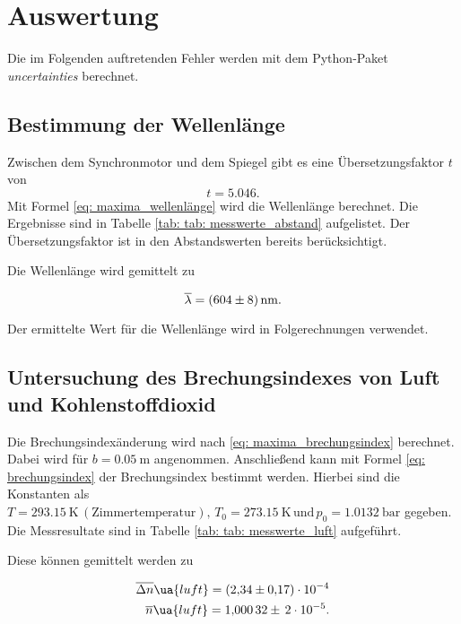 \newpage
\section{Auswertung}

Die im Folgenden auftretenden Fehler werden mit dem
Python-Paket \emph{uncertainties}\cite{uncertainties} berechnet.

\subsection{Bestimmung der Wellenlänge}
Zwischen dem Synchronmotor und dem Spiegel gibt es eine Übersetzungsfaktor $t$ von
\begin{equation*}
  t=5.046. %
\end{equation*}
Mit Formel \eqref{eq: maxima_wellenlänge} wird die Wellenlänge berechnet.
Die Ergebnisse sind in Tabelle \ref{tab: tab: messwerte_abstand} aufgelistet.
Der Übersetzungsfaktor ist in den Abstandswerten bereits berücksichtigt.



Die Wellenlänge wird gemittelt zu

\begin{equation}
  \label{eq:wellenlaenge}
  \overline{\lambda}=\SI{604\pm 8}{\nano\meter}.
\end{equation}

Der ermittelte Wert für die Wellenlänge wird in Folgerechnungen verwendet.

\subsection{Untersuchung des Brechungsindexes von Luft und Kohlenstoffdioxid}

Die Brechungsindexänderung wird nach \eqref{eq: maxima_brechungsindex} berechnet. Dabei wird
für $b=\SI{0.05}{\meter}$ angenommen. Anschließend kann mit Formel \eqref{eq: brechungsindex}
der Brechungsindex bestimmt werden. Hierbei sind die Konstanten als $T=\SI{293.15}{\kelvin}\, \left(\text{Zimmertemperatur}\right),\, T_0=\SI{273.15}{\kelvin} \, %
\text{und} \, p_0=\SI{1.0132}{\bar}$ gegeben.\cite{anleitung401}
Die Messresultate sind in Tabelle \ref{tab: tab: messwerte_luft} aufgeführt.

Diese können gemittelt werden zu

\begin{align}
  \label{eq:mittelwerte_luft}
  \begin{aligned}
    \overline{\Delta n}\ua{luft}=\num{2.34\pm 0.17 e-4}\\
    \overline{n}\ua{luft}=\num{1.00032}\pm\, \num{2e-5}.
  \end{aligned}
\end{align}

